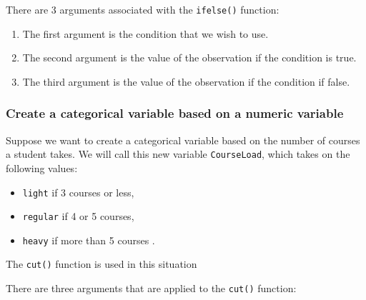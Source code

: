 \documentclass[
]{book}
\newenvironment{Shaded}{\begin{snugshade}}{\end{snugshade}}
\newcommand{\AttributeTok}[1]{\textcolor[rgb]{0.13,0.29,0.53}{#1}}
\newcommand{\ConstantTok}[1]{\textcolor[rgb]{0.56,0.35,0.01}{#1}}
\newcommand{\DecValTok}[1]{\textcolor[rgb]{0.00,0.00,0.81}{#1}}
\newcommand{\FunctionTok}[1]{\textcolor[rgb]{0.13,0.29,0.53}{\textbf{#1}}}
\newcommand{\NormalTok}[1]{#1}
\newcommand{\OtherTok}[1]{\textcolor[rgb]{0.56,0.35,0.01}{#1}}
\newcommand{\SpecialCharTok}[1]{\textcolor[rgb]{0.81,0.36,0.00}{\textbf{#1}}}
\newcommand{\StringTok}[1]{\textcolor[rgb]{0.31,0.60,0.02}{#1}}
\providecommand{\tightlist}{%
  \setlength{\itemsep}{0pt}\setlength{\parskip}{0pt}}
\begin{document}
There are 3 arguments associated with the \texttt{ifelse()} function:

\begin{enumerate}
\def\labelenumi{\arabic{enumi}.}
\item
  The first argument is the condition that we wish to use.
\item
  The second argument is the value of the observation if the condition is true.
\item
  The third argument is the value of the observation if the condition if false.
\end{enumerate}

\hypertarget{create-a-categorical-variable-based-on-a-numeric-variable}{%
\subsubsection{Create a categorical variable based on a numeric variable}\label{create-a-categorical-variable-based-on-a-numeric-variable}}

Suppose we want to create a categorical variable based on the number of courses a student takes. We will call this new variable \texttt{CourseLoad}, which takes on the following values:

\begin{itemize}
\tightlist
\item
  \texttt{light} if 3 courses or less,
\item
  \texttt{regular} if 4 or 5 courses,
\item
  \texttt{heavy} if more than 5 courses .
\end{itemize}

The \texttt{cut()} function is used in this situation

\begin{Shaded}
\end{Shaded}

There are three arguments that are applied to the \texttt{cut()} function:
\end{document}
